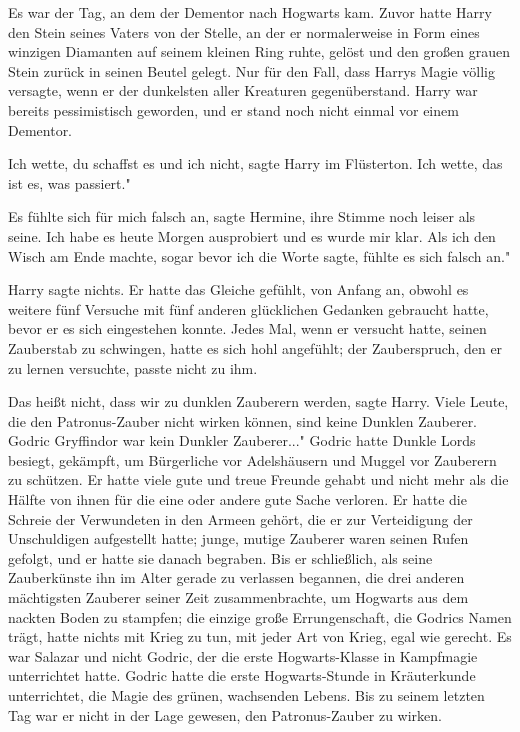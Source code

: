Es war der Tag, an dem der Dementor nach Hogwarts kam. Zuvor hatte Harry den
Stein seines Vaters von der Stelle, an der er normalerweise in Form eines
winzigen Diamanten auf seinem kleinen Ring ruhte, gelöst und den großen grauen
Stein zurück in seinen Beutel gelegt. Nur für den Fall, dass Harrys Magie völlig
versagte, wenn er der dunkelsten aller Kreaturen gegenüberstand. Harry war
bereits pessimistisch geworden, und er stand noch nicht einmal vor einem
Dementor.

\glqq Ich wette, du schaffst es und ich nicht\grqq{}, sagte Harry im Flüsterton.
\glqq Ich wette, das ist es, was passiert."

\glqq Es fühlte sich für mich falsch an\grqq{}, sagte Hermine, ihre Stimme noch
leiser als seine. \glqq Ich habe es heute Morgen ausprobiert und es wurde mir
klar. Als ich den Wisch am Ende machte, sogar bevor ich die Worte sagte, fühlte
es sich falsch an."

Harry sagte nichts. Er hatte das Gleiche gefühlt, von Anfang an, obwohl es
weitere fünf Versuche mit fünf anderen glücklichen Gedanken gebraucht hatte,
bevor er es sich eingestehen konnte. Jedes Mal, wenn er versucht hatte, seinen
Zauberstab zu schwingen, hatte es sich hohl angefühlt; der Zauberspruch, den er
zu lernen versuchte, passte nicht zu ihm.

\glqq Das heißt nicht, dass wir zu dunklen Zauberern werden\grqq{}, sagte Harry.
\glqq Viele Leute, die den Patronus-Zauber nicht wirken können, sind keine
Dunklen Zauberer. Godric Gryffindor war kein Dunkler Zauberer..." Godric hatte
Dunkle Lords besiegt, gekämpft, um Bürgerliche vor Adelshäusern und Muggel vor
Zauberern zu schützen. Er hatte viele gute und treue Freunde gehabt und nicht
mehr als die Hälfte von ihnen für die eine oder andere gute Sache verloren. Er
hatte die Schreie der Verwundeten in den Armeen gehört, die er zur Verteidigung
der Unschuldigen aufgestellt hatte; junge, mutige Zauberer waren seinen Rufen
gefolgt, und er hatte sie danach begraben. Bis er schließlich, als seine
Zauberkünste ihn im Alter gerade zu verlassen begannen, die drei anderen
mächtigsten Zauberer seiner Zeit zusammenbrachte, um Hogwarts aus dem nackten
Boden zu stampfen; die einzige große Errungenschaft, die Godrics Namen trägt,
hatte nichts mit Krieg zu tun, mit jeder Art von Krieg, egal wie gerecht. Es war
Salazar und nicht Godric, der die erste Hogwarts-Klasse in Kampfmagie
unterrichtet hatte. Godric hatte die erste Hogwarts-Stunde in Kräuterkunde
unterrichtet, die Magie des grünen, wachsenden Lebens. Bis zu seinem letzten Tag
war er nicht in der Lage gewesen, den Patronus-Zauber zu wirken.

